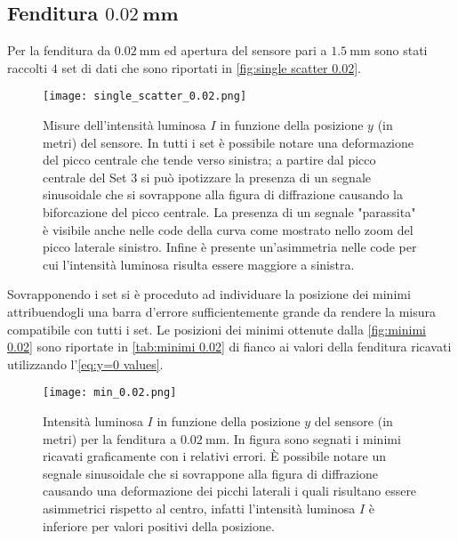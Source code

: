 \documentclass[../main.tex]{subfiles}
\begin{document}
\subsection{Fenditura $\mathbf{\qty{0.02}{\mm}}$}

Per la fenditura da $\qty{0.02}{\mm}$ ed apertura del sensore pari a $\qty{1.5}{\mm}$ sono stati raccolti $4$ set di dati che sono riportati in \autoref{fig:single scatter 0.02}.

\begin{figure}[ht!]
    \centering
    \texttt{[image: single\_scatter\_0.02.png]}
    \caption{Misure dell'intensità luminosa $I$ in funzione della posizione $y$ (in metri) del sensore. In tutti i set è possibile notare una deformazione del picco centrale che tende verso sinistra; a partire dal picco centrale del Set $3$ si può ipotizzare la presenza di un segnale sinusoidale che si sovrappone alla figura di diffrazione causando la biforcazione del picco centrale. La presenza di un segnale "parassita" è visibile anche nelle code della curva come mostrato nello zoom del picco laterale sinistro. Infine è presente un'asimmetria nelle code per cui l'intensità luminosa risulta essere maggiore a sinistra.}
    \label{fig:single scatter 0.02}
\end{figure}

Sovrapponendo i set si è proceduto ad individuare la posizione dei minimi attribuendogli una barra d'errore sufficientemente grande da rendere la misura compatibile con tutti i set. Le posizioni dei minimi ottenute dalla \autoref{fig:minimi 0.02} sono riportate in \autoref{tab:minimi 0.02} di fianco ai valori della fenditura ricavati utilizzando l'\autoref{eq:y=0 values}.

\begin{figure}[ht!]
    \centering
    \texttt{[image: min\_0.02.png]}
    \caption{Intensità luminosa $I$ in funzione della posizione $y$ del sensore (in metri) per la fenditura a $\qty{0.02}{\milli\metre}$. In figura sono segnati i minimi ricavati graficamente con i relativi errori. È possibile notare un segnale sinusoidale che si sovrappone alla figura di diffrazione causando una deformazione dei picchi laterali i quali risultano essere asimmetrici rispetto al centro, infatti l'intensità luminosa $I$ è inferiore per valori positivi della posizione.
    } %
    \label{fig:minimi 0.02}
\end{figure}
\end{document}
